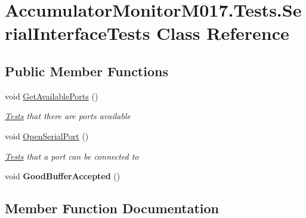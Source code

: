 \hypertarget{class_accumulator_monitor_m017_1_1_tests_1_1_serial_interface_tests}{}\section{Accumulator\+Monitor\+M017.\+Tests.\+Serial\+Interface\+Tests Class Reference}
\label{class_accumulator_monitor_m017_1_1_tests_1_1_serial_interface_tests}
\subsection*{Public Member Functions}
\begin{DoxyCompactItemize}
\item 
void \hyperlink{class_accumulator_monitor_m017_1_1_tests_1_1_serial_interface_tests_a9767ddba4cf97dcd1bcf695c011e6f08}{Get\+Available\+Ports} ()
\begin{DoxyCompactList}\small\item\em \hyperlink{namespace_accumulator_monitor_m017_1_1_tests}{Tests} that there are ports available \end{DoxyCompactList}\item 
void \hyperlink{class_accumulator_monitor_m017_1_1_tests_1_1_serial_interface_tests_a118111302f955310dcc503306bf43cfd}{Open\+Serial\+Port} ()
\begin{DoxyCompactList}\small\item\em \hyperlink{namespace_accumulator_monitor_m017_1_1_tests}{Tests} that a port can be connected to \end{DoxyCompactList}\item 
\mbox{\label{class_accumulator_monitor_m017_1_1_tests_1_1_serial_interface_tests_a1ee041ac0e34b7a81375f60ecdbdcdd6}} 
void {\bfseries Good\+Buffer\+Accepted} ()
\end{DoxyCompactItemize}


\subsection{Member Function Documentation}
\mbox{\label{class_accumulator_monitor_m017_1_1_tests_1_1_serial_interface_tests_a9767ddba4cf97dcd1bcf695c011e6f08}} 
